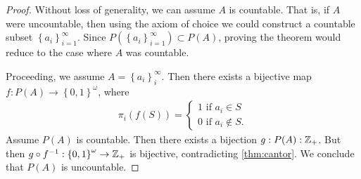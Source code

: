 \begin{proof}
	Without loss of generality, we can assume $A$ is countable. That is, if $A$
	were uncountable, then using the axiom of choice we could construct a
	countable subset $\left\{ a_{i} \right\}_{i=1}^{\infty}$. Since 
	$P(\left\{ a_{i} \right\}_{i=1}^{\infty}) \subset P(A)$, proving the theorem
	would reduce to the case where $A$ was countable.

	Proceeding, we assume $A = \left\{ a_{i} \right\}_{i}^{\infty}$.
	Then there exists a bijective map $f: P(A) \to \left\{ 0,1 \right\}^{\omega}$,
	where 
	\begin{equation*}
	\begin{split}
		\pi_{i}(f(S)) = \begin{cases}
			1 \text{ if } a_{i} \in S \\
			0 \text{ if } a_{i} \not \in S.
		\end{cases}
	\end{split}
	\end{equation*}
	Assume $P(A)$ is countable. Then there exists a bijection $g: P(A) :
	\mathbb{Z}_{+}$. But then $g\circ f^{-1}: \left\{ 0,1 \right\}^{\omega} \to
	\mathbb{Z}_{+}$ is bijective, contradicting \cref{thm:cantor}.
	We conclude that $P(A)$ is uncountable.
\end{proof}

